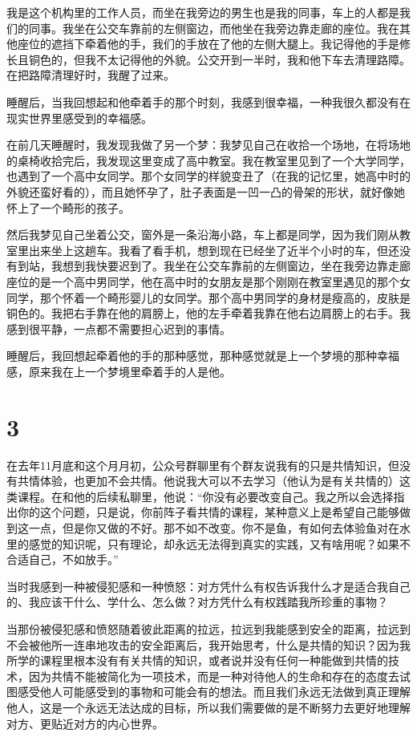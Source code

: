 我是这个机构里的工作人员，而坐在我旁边的男生也是我的同事，车上的人都是我们的同事。我坐在公交车靠前的左侧窗边，而他坐在我旁边靠走廊的座位。我在其他座位的遮挡下牵着他的手，我们的手放在了他的左侧大腿上。我记得他的手是修长且铜色的，但我不太记得他的外貌。公交开到一半时，我和他下车去清理路障。在把路障清理好时，我醒了过来。

睡醒后，当我回想起和他牵着手的那个时刻，我感到很幸福，一种我很久都没有在现实世界里感受到的幸福感。

\tristarsepline

在前几天睡醒时，我发现我做了另一个梦：我梦见自己在收拾一个场地，在将场地的桌椅收拾完后，我发现这里变成了高中教室。我在教室里见到了一个大学同学，也遇到了一个高中女同学。那个女同学的样貌变丑了（在我的记忆里，她高中时的外貌还蛮好看的），而且她怀孕了，肚子表面是一凹一凸的骨架的形状，就好像她怀上了一个畸形的孩子。

然后我梦见自己坐着公交，窗外是一条沿海小路，车上都是同学，因为我们刚从教室里出来坐上这趟车。我看了看手机，想到现在已经坐了近半个小时的车，但还没有到站，我想到我快要迟到了。我坐在公交车靠前的左侧窗边，坐在我旁边靠走廊座位的是一个高中男同学，他在高中时的女朋友是那个刚刚在教室里遇见的那个女同学，那个怀着一个畸形婴儿的女同学。那个高中男同学的身材是瘦高的，皮肤是铜色的。我把右手靠在他的肩膀上，他的左手牵着我靠在他右边肩膀上的右手。我感到很平静，一点都不需要担心迟到的事情。

睡醒后，我回想起牵着他的手的那种感觉，那种感觉就是上一个梦境的那种幸福感，原来我在上一个梦境里牵着手的人是他。



\section*{3}

在去年11月底和这个月月初，公众号群聊里有个群友说我有的只是共情知识，但没有共情体验，也更加不会共情。他说我大可以不去学习（他认为是有关共情的）这类课程。在和他的后续私聊里，他说：“你没有必要改变自己。我之所以会选择指出你的这个问题，只是说，你前阵子看共情的课程，某种意义上是希望自己能够做到这一点，但是你又做的不好。那不如不改变。你不是鱼，有如何去体验鱼对在水里的感觉的知识呢，只有理论，却永远无法得到真实的实践，又有啥用呢？如果不合适自己，不如放手。”

当时我感到一种被侵犯感和一种愤怒：对方凭什么有权告诉我什么才是适合我自己的、我应该干什么、学什么、怎么做？对方凭什么有权践踏我所珍重的事物？

当那份被侵犯感和愤怒随着彼此距离的拉远，拉远到我能感到安全的距离，拉远到不会被他所一连串地攻击的安全距离后，我开始思考，什么是共情的知识？因为我所学的课程里根本没有有关共情的知识，或者说并没有任何一种能做到共情的技术，因为共情不能被简化为一项技术，而是一种对待他人的生命和存在的态度\pozhehao{}去试图感受他人可能感受到的事物和可能会有的想法。而且我们永远无法做到真正理解他人，这是一个永远无法达成的目标，所以我们需要做的是不断努力去更好地理解对方、更贴近对方的内心世界。

